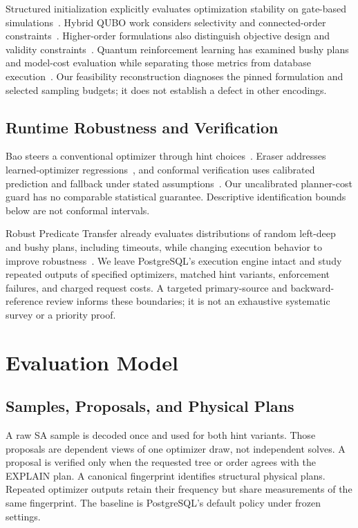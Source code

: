 \documentclass[conference]{IEEEtran}
\begin{document}
Structured initialization explicitly evaluates optimization stability on gate-based
simulations~\cite{shekar2026spiq}. Hybrid QUBO work considers selectivity and
connected-order constraints~\cite{nayak2026hybridjournal}. Higher-order formulations
also distinguish objective design and validity constraints~\cite{uotila2025hubo}.
Quantum reinforcement learning has examined bushy plans and model-cost evaluation
while separating those metrics from database execution~\cite{franz2024hype}.
Our feasibility reconstruction diagnoses the pinned formulation and selected
sampling budgets; it does not establish a defect in other encodings.

\subsection{Runtime Robustness and Verification}
Bao steers a conventional optimizer through hint choices~\cite{marcus2021bao}.
Eraser addresses learned-optimizer regressions~\cite{weng2024eraser}, and conformal
verification uses calibrated prediction and fallback under stated
assumptions~\cite{liu2025conformal}. Our uncalibrated planner-cost guard has no
comparable statistical guarantee. Descriptive identification bounds below are
not conformal intervals.

Robust Predicate Transfer already evaluates distributions of random left-deep and
bushy plans, including timeouts, while changing execution behavior to improve
robustness~\cite{zhao2025rpt}. We leave PostgreSQL's execution engine intact and
study repeated outputs of specified optimizers, matched hint variants, enforcement
failures, and charged request costs. A targeted primary-source and backward-reference
review informs these boundaries; it is not an exhaustive systematic survey or a
priority proof.

\section{Evaluation Model}
\subsection{Samples, Proposals, and Physical Plans}
A raw SA sample is decoded once and used for both hint variants. Those proposals
are dependent views of one optimizer draw, not independent solves. A proposal is
verified only when the requested tree or order agrees with the EXPLAIN plan.
A canonical fingerprint identifies structural physical plans. Repeated optimizer
outputs retain their frequency but share measurements of the same fingerprint.
The baseline is PostgreSQL's default policy under frozen settings.
\end{document}
